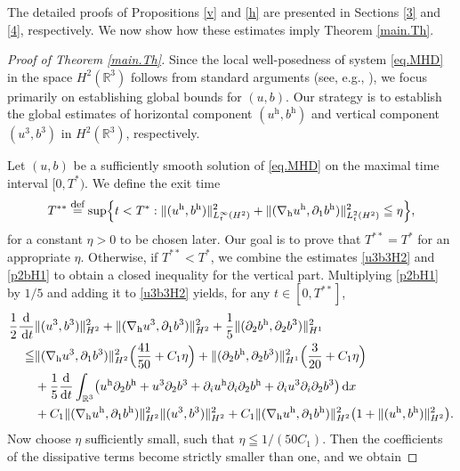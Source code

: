 \documentclass[11pt]{amsart}
\theoremstyle{definition}
\newcommand{\R}{\mathbb{R}}
\def\eqdefa{\buildrel\hbox{\footnotesize def}\over =}
\newcommand{\dx}{\,{\rm d}x}
\newcommand{\dt}{\,{\rm d}t}
\numberwithin{equation}{section}
\begin{document}
The detailed proofs of Propositions \ref{v} and \ref{h} are presented in Sections \ref{3} and \ref{4}, respectively. We now show how these estimates imply Theorem \ref{main.Th}.

\begin{proof}[Proof of Theorem \ref{main.Th}]
	Since the local well-posedness of system \eqref{eq.MHD} in the space $H^2(\R^3)$ follows from standard arguments  (see, e.g., \cite{02majda}), we focus primarily on establishing global bounds for $(u,b)$. Our strategy  is to establish the global estimates of horizontal component $(u^\mathrm{h},b^\mathrm{h})$ and vertical component $(u^3,b^3)$ in $H^2(\R^3)$, respectively.
	
	Let $(u,b)$ be a sufficiently smooth solution of \eqref{eq.MHD} on the maximal time interval $[0,T^*)$. We define the exit time
	\begin{align}\label{eq:exit-time}
		T^{**}\eqdefa \sup\Bigl\{t<T^*:\|(u^\mathrm{h},b^\mathrm{h})\|_{L_{t}^{\infty}(H^2)}^2+\|(\nabla_\mathrm{h}u^\mathrm{h},\partial_1 b^\mathrm{h})\|_{L_{t}^{2}(H^2)}^2\leqq \eta \Bigr\},
	\end{align}
	for a constant $\eta>0$ to be chosen later. Our goal is to prove that $T^{**}=T^*$ for an appropriate $\eta$. Otherwise, if $T^{**}<T^*$, we combine the estimates \eqref{u3b3H2} and \eqref{p2bH1} to obtain a closed inequality for the vertical part. Multiplying \eqref{p2bH1} by $1/5$ and adding it to \eqref{u3b3H2} yields, for any $t\in[0,T^{**}]$,
	\begin{align*}
		\frac12 \frac{\mathrm{d}}{\dt}&\|(u^3,b^3)\|^2_{H^2}+\|(\nabla_{\mathrm{h}} u^3,\partial_1b^3)\|^2_{H^2}+\frac{1}{5}\|(\partial_2b^\mathrm{h},\partial_2b^3)\|_{H^1}^2\\
		\leqq& \|(\nabla_{\mathrm{h}} u^3,\partial_1b^3)\|_{H^2}^2\Bigl(\frac{41}{50}+C_1\eta\Bigr)+\|(\partial_2b^\mathrm{h},\partial_2b^3)\|_{H^1}^2\Bigl(\frac{3}{20}+C_1\eta\Bigr)\\
		&+\frac{1}{5}\frac{\mathrm{d}}{\mathrm{d}t}\int_{\R^3}\bigl(u^\mathrm{h}\partial_2 b^\mathrm{h}+u^3\partial_2 b^3+\partial_{i}u^\mathrm{h}\partial_{i}\partial_{2}b^\mathrm{h}+\partial_{i}u^3\partial_{i}\partial_{2}b^3\bigr)\dx\\
		&+C_1\|(\nabla_{\mathrm{h}} u^\mathrm{h},\partial_1b^\mathrm{h})\|_{H^{2}}^2\|(u^3,b^3)\|_{H^2}^2+C_1\|(\nabla_{\mathrm{h}} u^\mathrm{h},\partial_{1}b^\mathrm{h})\|_{H^{2}}^2\bigl(1+\|( u^\mathrm{h}, b^\mathrm{h})\|_{H^2}^2\bigr).
	\end{align*}
	Now choose $\eta$ sufficiently small, such that $\eta\leqq 1/(50C_1)$. Then the coefficients of the dissipative terms become strictly smaller than one, and we obtain

\end{proof}
\end{document}
